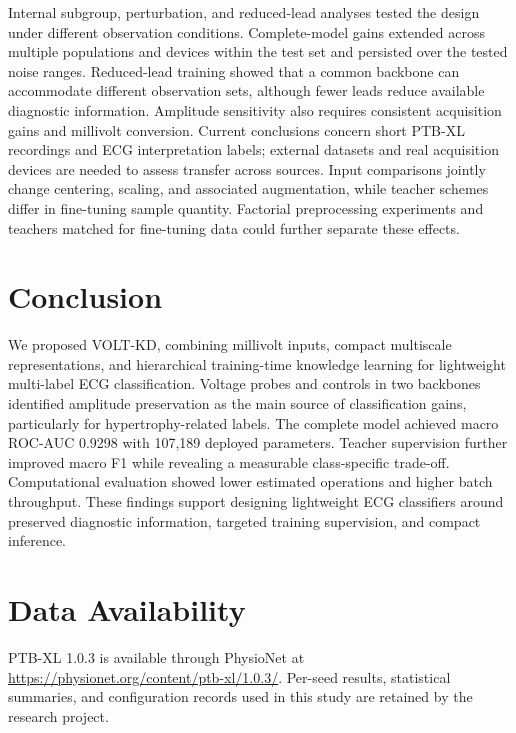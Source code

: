 \documentclass[11pt,a4paper]{article}
\begin{document}
Internal subgroup, perturbation, and reduced-lead analyses tested the design under different observation conditions. Complete-model gains extended across multiple populations and devices within the test set and persisted over the tested noise ranges. Reduced-lead training showed that a common backbone can accommodate different observation sets, although fewer leads reduce available diagnostic information. Amplitude sensitivity also requires consistent acquisition gains and millivolt conversion. Current conclusions concern short PTB-XL recordings and ECG interpretation labels; external datasets and real acquisition devices are needed to assess transfer across sources. Input comparisons jointly change centering, scaling, and associated augmentation, while teacher schemes differ in fine-tuning sample quantity. Factorial preprocessing experiments and teachers matched for fine-tuning data could further separate these effects.

\section{Conclusion}
We proposed VOLT-KD, combining millivolt inputs, compact multiscale representations, and hierarchical training-time knowledge learning for lightweight multi-label ECG classification. Voltage probes and controls in two backbones identified amplitude preservation as the main source of classification gains, particularly for hypertrophy-related labels. The complete model achieved macro ROC-AUC 0.9298 with 107,189 deployed parameters. Teacher supervision further improved macro F1 while revealing a measurable class-specific trade-off. Computational evaluation showed lower estimated operations and higher batch throughput. These findings support designing lightweight ECG classifiers around preserved diagnostic information, targeted training supervision, and compact inference.

\section*{Data Availability}
PTB-XL 1.0.3 is available through PhysioNet at \url{https://physionet.org/content/ptb-xl/1.0.3/}. Per-seed results, statistical summaries, and configuration records used in this study are retained by the research project.
\end{document}
